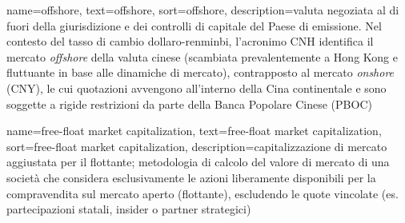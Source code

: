  {
    name=offshore,
    text=offshore,
    sort=offshore,
    description={valuta negoziata al di fuori della giurisdizione e dei controlli di capitale del Paese di emissione. Nel contesto del tasso di cambio dollaro-renminbi, l'acronimo CNH identifica il mercato \emph{offshore} della valuta cinese (scambiata prevalentemente a Hong Kong e fluttuante in base alle dinamiche di mercato), contrapposto al mercato \emph{onshore} (CNY), le cui quotazioni avvengono all'interno della Cina continentale e sono soggette a rigide restrizioni da parte della Banca Popolare Cinese (PBOC)}
}

 {
    name=free-float market capitalization,
    text=free-float market capitalization,
    sort=free-float market capitalization,
    description={capitalizzazione di mercato aggiustata per il flottante; metodologia di calcolo del valore di mercato di una società che considera esclusivamente le azioni liberamente disponibili per la compravendita sul mercato aperto (flottante), escludendo le quote vincolate (es. partecipazioni statali, insider o partner strategici)}
}

